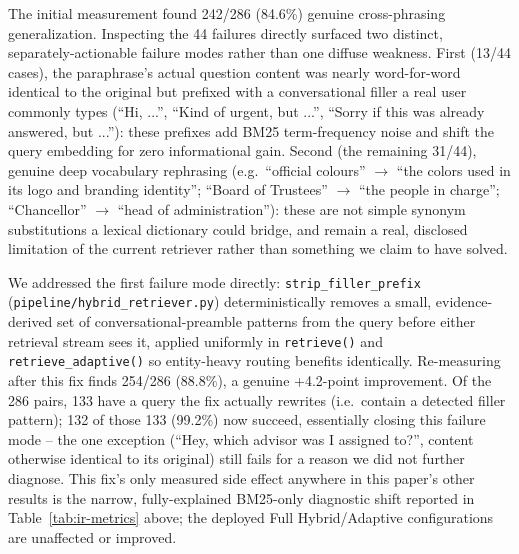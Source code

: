 \documentclass[a4paper,twoside]{article}
\begin{document}
The initial measurement found 242/286 (84.6\%) genuine cross-phrasing generalization. Inspecting the 44 failures directly surfaced two distinct, separately-actionable failure modes rather than one diffuse weakness. First (13/44 cases), the paraphrase's actual question content was nearly word-for-word identical to the original but prefixed with a conversational filler a real user commonly types (``Hi, ...'', ``Kind of urgent, but ...'', ``Sorry if this was already answered, but ...''): these prefixes add BM25 term-frequency noise and shift the query embedding for zero informational gain. Second (the remaining 31/44), genuine deep vocabulary rephrasing (e.g.\ ``official colours'' $\to$ ``the colors used in its logo and branding identity''; ``Board of Trustees'' $\to$ ``the people in charge''; ``Chancellor'' $\to$ ``head of administration''): these are not simple synonym substitutions a lexical dictionary could bridge, and remain a real, disclosed limitation of the current retriever rather than something we claim to have solved.

We addressed the first failure mode directly: \texttt{strip\_filler\_prefix} (\texttt{pipeline/hybrid\_retriever.py}) deterministically removes a small, evidence-derived set of conversational-preamble patterns from the query before either retrieval stream sees it, applied uniformly in \texttt{retrieve()} and \texttt{retrieve\_adaptive()} so entity-heavy routing benefits identically. Re-measuring after this fix finds 254/286 (88.8\%), a genuine +4.2-point improvement. Of the 286 pairs, 133 have a query the fix actually rewrites (i.e.\ contain a detected filler pattern); 132 of those 133 (99.2\%) now succeed, essentially closing this failure mode -- the one exception (``Hey, which advisor was I assigned to?'', content otherwise identical to its original) still fails for a reason we did not further diagnose. This fix's only measured side effect anywhere in this paper's other results is the narrow, fully-explained BM25-only diagnostic shift reported in Table~\ref{tab:ir-metrics} above; the deployed Full Hybrid/Adaptive configurations are unaffected or improved.
\end{document}
